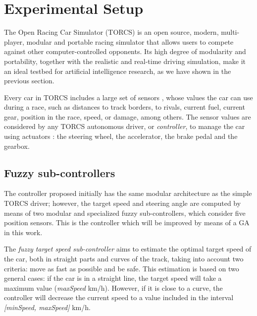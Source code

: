 \documentclass[conference]{IEEEtran}
\begin{document}

\section{Experimental Setup}
\label{sec:experimental_setup}

The Open Racing Car Simulator (TORCS) \cite{WebTORCS} is an open
source, modern, multi-player, modular and portable racing simulator
that allows users to compete against other computer-controlled opponents.
Its high degree of modularity and portability, together with the
realistic and real-time driving simulation, make it an ideal testbed
for artificial intelligence research, as we have shown in the previous section.

Every car in TORCS includes  a large set of sensors \cite{Torcs3},
whose values the car can use during a race, such as distances to track borders, to rivals, current fuel, current gear, position in the race, speed, or damage, among others.
The sensor values are considered by any TORCS autonomous driver, or
{\em controller}, to manage the car using actuators \cite{Torcs3}: the
steering wheel, the accelerator, the brake pedal and the gearbox.   



\subsection{Fuzzy sub-controllers}
\label{subsec:subcontrollers}

The controller proposed initially \cite{evo17} has the same modular
architecture as the simple TORCS driver; however, the target speed and
steering angle are computed by means of two modular and specialized
fuzzy sub-controllers, which consider five position sensors. This is
the controller which will be improved by means of a GA in this
work.

The {\em fuzzy target speed sub-controller} aims to estimate the
optimal target speed of the car, both in straight parts and curves of
the track, taking into account two criteria: move as fast as possible
and be safe. This estimation is based on two general cases: if the car
is in a straight line, the target speed will take a maximum value
(\textit{maxSpeed} km/h). However, if it is close to a curve, the
controller will decrease the current speed to a value included in the
interval \textit{[minSpeed, maxSpeed]} km/h. 
\end{document}
